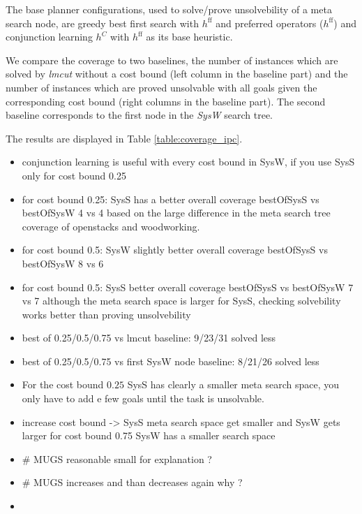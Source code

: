 The base planner configurations, used to solve/prove unsolvebility of a meta search node,
are greedy best first search with $h^{\text{ff}}$ and preferred operators ($h^{\text{ff}}$) and  
conjunction learning $h^C$ with $h^{\text{ff}}$ as its base heuristic. 

We compare the coverage to two baselines, the number of instances which are solved by \emph{lmcut} without
a cost bound (left column in the baseline part) and the number of instances which are proved
unsolvable with all goals given the corresponding cost bound (right columns in the baseline part). 
The second baseline corresponds to the first node in the \emph{SysW} search tree.


The results are displayed in Table \ref{table:coverage_ipc}.

\begin{itemize}
	\item conjunction learning is useful with every cost bound in SysW,
		if you use SysS only for cost bound 0.25
	\item for cost bound 0.25: SysS has a better overall coverage 
		bestOfSysS vs bestOfSysW 4 vs 4
		based on the large difference in the meta search tree coverage of openstacks and woodworking.
	\item for cost bound 0.5: SysW slightly better overall coverage 
		bestOfSysS vs bestOfSysW 8 vs 6
	\item for cost bound 0.5: SysS  better overall coverage 
		bestOfSysS vs bestOfSysW 7 vs 7
		although the meta search space is larger for SysS, checking solvebility
		works better than proving unsolvebility
	\item best of 0.25/0.5/0.75 vs lmcut baseline: 9/23/31 solved less
	\item best of 0.25/0.5/0.75 vs first SysW node baseline: 8/21/26 solved less
	\item  For the cost bound $0.25$ SysS has clearly a smaller 
		meta search space, you only have to add e few goals until the task is unsolvable. 
	\item increase cost bound -> SysS meta search space get smaller and SysW gets larger
		for cost bound 0.75 SysW has a smaller search space
	\item \# MUGS reasonable small for explanation ?
	\item \# MUGS increases and than decreases again why ?
	\item {}
\end{itemize}




